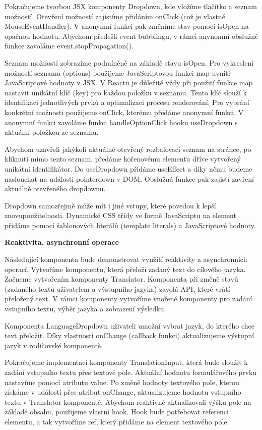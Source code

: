 Pokračujeme tvorbou JSX komponenty Dropdown, kde vložíme tlačítko a seznam možností. Otevření možností zajistíme přidáním onClick (což je vlastně MouseEventHandler). 
V anonymní funkci pak změníme stav pomocí isOpen na opačnou hodnotu. Abychom předešli event bubblingu, v rámci anynomní obslužné funkce zavoláme event.stopPropagation().

Seznam možností zobrazíme podmíněně na základě stavu isOpen. Pro vykreslení možností seznamu (options) použijeme JavaScriptovou funkci map uvnitř JavaScriptové hodnoty v JSX. 
V Reactu je důležité vždy při použití funkce map nastavit unikátní klíč (key) pro každou položku v seznamu. Tento klíč slouží k identifikaci jednotlivých prvků a optimalizaci procesu renderování. 
Pro vybrání konkrétní možnosti použijeme onClick, kterému předáme anonymní funkci. V anonymní funkci zavoláme funkci handleOptionClick hooku useDropdown s aktuální položkou ze seznamu.

Abychom uzavřeli jakýkoli aktuálně otevřený rozbalovací seznam na stránce, po kliknutí mimo tento seznam, předáme kořenovému elementu dříve vytvořený unikátní identifikátor. 
Do useDropdown přidáme useEffect a díky němu budeme naslouchat na události pointerdown v DOM. Obslužná funkce pak zajistí zavření aktuálně otevřeného dropdownu.

Dropdown samozřejmě může mít i jiné vstupy, které povedou k lepší znovupoužitelnosti. 
Dynamické CSS třídy ve formě JavaScriptu na element přidáme pomocí šablonových literálů (template literals) a JavaScriptové hodnoty.

\begin{flushleft}
  \textbf{Reaktivita, asynchronní operace}
\end{flushleft}

Následující komponenta bude demonstrovat využití reaktivity a asynchronních operací. Vytvoříme komponentu, která přeloží zadaný text do cílového jazyka. 
Začneme vytvořením komponenty Translator. Komponenta při změně stavů (zadaného textu uživatelem a výstupního jazyka) zavolá API, které vrátí přeložený text.
V rámci komponenty vytvoříme vnořené komponenty pro zadání vstupního textu, výběr jazyka a zobrazení výsledku.

Komponenta LanguageDropdown uživateli umožní vybrat jazyk, do kterého chce text přeložit. 
Díky vlastnosti onChange (callback funkci) aktualizujeme výstupní jazyk v rodičovské komponentě. 

Pokračujeme implementací komponenty TranslationInput, která bude sloužit k zadání vstupního textu přes textové pole. Aktuální hodnotu formulářového prvku nastavíme pomocí atributu value.
Po změně hodnoty textového pole, kterou získáme v události přes atribut onChange, aktualizujeme hodnotu vstupního textu v Translator komponentě. 
Abychom reaktivně aktualizovali výšku pole na základě obsahu, použijeme vlastní hook. 
Hook bude potřebovat referenci elementu, a tak vytvoříme ref, který přidáme na element textového pole.

